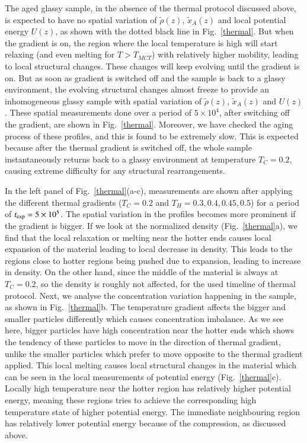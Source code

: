  The aged glassy sample, in the absence of the thermal protocol discussed above, is expected to have no spatial variation of $\tilde{\rho}(z)$, $\tilde{x}_A(z)$ and local potential energy $U(z)$, as shown with the dotted black line in Fig.~\ref{thermal}. But when the gradient is on, the region where the local temperature is high will start relaxing (and even melting for $T > T_{MCT}$) with relatively higher mobility, leading to local structural changes. These changes will keep evolving until the gradient is on. But as soon as gradient is switched off and the sample is back to a glassy environment, the evolving structural changes almost freeze \cite{vaibhav2020response} to provide an inhomogeneous glassy sample with spatial variation of $\tilde{\rho}(z)$, $\tilde{x}_A(z)$ and $U(z)$. These spatial measurements done over a period of $5 \times 10^4$, after switching off the gradient, are shown in Fig.~\ref{thermal}. Moreover, we have checked the aging process of these profiles, and this is found to be extremely slow. This is expected because after the thermal gradient is switched off, the whole sample instantaneously returns back to a glassy environment at temperature $T_C = 0.2$, causing extreme difficulty for any structural rearrangements.  
 
 In the left panel of Fig.~\ref{thermal}(a-c), measurements are shown after applying the different thermal gradients ($T_C = 0.2$ and $T_H = 0.3,0.4,0.45,0.5$) for a period of $t_{\rm exp} = 5\times 10^5$. The spatial variation in the profiles becomes more prominent if the gradient is bigger. If we look at the normalized density (Fig.~\ref{thermal}a), we find that the local relaxation or melting near the hotter ends causes local expansion of the material leading to local decrease in density. This leads to the regions close to hotter regions being pushed due to expansion, leading to increase in density. On the other hand, since the middle of the material is always at $T_C = 0.2$, so the density is roughly not affected, for the used timeline of thermal protocol. Next, we analyse the concentration variation happening in the sample, as shown in Fig.~\ref{thermal}b. The temperature gradient affects the bigger and smaller particles differently which causes concentration imbalance. As we see here, bigger particles have high concentration near the hotter ends which shows the tendency of these particles to move in the direction of thermal gradient, unlike the smaller particles which prefer to move opposite to the thermal gradient applied. This local melting causes local structural changes in the material which can be seen in the local measurements of potential energy (Fig.~\ref{thermal}c). Locally high temperature near the hotter region has relatively higher potential energy, meaning these regions tries to achieve the corresponding high temperature state of higher potential energy. The immediate neighbouring region has relatively lower potential energy because of the compression, as discussed above.
 

